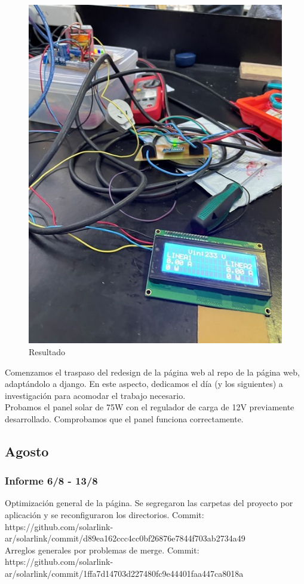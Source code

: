 \begin{figure}[H]
    \centering
    \includegraphics[width=0.5\linewidth]{informes/IMG_8766.jpg}
    \caption{Resultado}
    
\end{figure}

Comenzamos el traspaso del redesign de la página web al repo de la página web, adaptándolo a django. En este aspecto, dedicamos el día (y los siguientes) a investigación para acomodar el trabajo necesario.\\

Probamos el panel solar de 75W con el regulador de carga de 12V previamente desarrollado. Comprobamos que el panel funciona correctamente.\\


\subsection{Agosto}

\subsubsection{Informe 6/8 - 13/8}

Optimización general de la página. Se segregaron las carpetas del proyecto por aplicación y se reconfiguraron los directorios. Commit:
https://github.com/solarlink-\\ar/solarlink/commit/d89ea162ccc4cc0bf26876e7844f703ab2734a49\\

Arreglos generales por problemas de merge. Commit:\\
https://github.com/solarlink-\\ar/solarlink/commit/1ffa7d14703d227480fc9e44401faa447ca8018a\\

